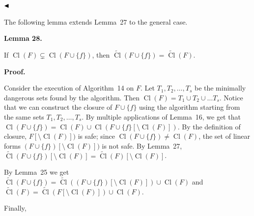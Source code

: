 $\hfill\blacktriangleleft$\par



The following lemma extends Lemma 27 to the general case.\par



\par\medskip\noindent\textbf{
Lemma 28.
}\par



If $\mathop{\mathrm{Cl}}(F)\subsetneq\mathop{\mathrm{Cl}}(F\cup\{f\})$, then $\widetilde{\mathop{\mathrm{Cl}}}(F\cup\{f\})=\widetilde{\mathop{\mathrm{Cl}}}(F)$.\par



\par\medskip\noindent\textbf{Proof.}\par


Consider the execution of Algorithm 14 on $F$.
Let $T_{1},T_{2},\dots,T_{s}$ be the minimally dangerous sets found by the algorithm. Then $\mathop{\mathrm{Cl}}(F)=T_{1}\cup T_{2}\cup\dots T_{s}$.
Notice that we can construct the closure of $F\cup\{f\}$ using the algorithm starting from the same sets $T_{1},T_{2},\dots,T_{s}$.
By multiple applications of Lemma 16, we get that $\mathop{\mathrm{Cl}}(F\cup\{f\})=\mathop{\mathrm{Cl}}(F)\cup\mathop{\mathrm{Cl}}(F\cup\{f\}[\setminus\mathop{\mathrm{Cl}}(F)])$.
By the definition of closure, $F[\setminus\mathop{\mathrm{Cl}}(F)])$ is safe;
since $\mathop{\mathrm{Cl}}(F\cup\{f\})\neq\mathop{\mathrm{Cl}}(F)$, the set of linear forms $(F\cup\{f\})[\setminus\mathop{\mathrm{Cl}}(F)])$ is not safe.
By Lemma 27, $\widetilde{\mathop{\mathrm{Cl}}}(F\cup\{f\})[\setminus\mathop{\mathrm{Cl}}(F)]=\widetilde{\mathop{\mathrm{Cl}}}(F)[\setminus\mathop{\mathrm{Cl}}(F)]$.\par



By Lemma 25
we get $\widetilde{\mathop{\mathrm{Cl}}}(F\cup\{f\})=\widetilde{\mathop{\mathrm{Cl}}}((F\cup\{f\})[\setminus\mathop{\mathrm{Cl}}(F)])\cup\mathop{\mathrm{Cl}}(F)$ and $\widetilde{\mathop{\mathrm{Cl}}}(F)=\widetilde{\mathop{\mathrm{Cl}}}(F[\setminus\mathop{\mathrm{Cl}}(F)])\cup\mathop{\mathrm{Cl}}(F)$.\par



Finally,\par





